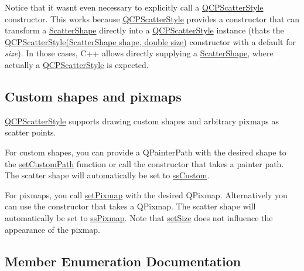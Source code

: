 \begin{DoxyCodeInclude}
\end{DoxyCodeInclude}
 Notice that it wasn\textquotesingle{}t even necessary to explicitly call a \hyperlink{classQCPScatterStyle}{Q\+C\+P\+Scatter\+Style} constructor. This works because \hyperlink{classQCPScatterStyle}{Q\+C\+P\+Scatter\+Style} provides a constructor that can transform a \hyperlink{classQCPScatterStyle_adb31525af6b680e6f1b7472e43859349}{Scatter\+Shape} directly into a \hyperlink{classQCPScatterStyle}{Q\+C\+P\+Scatter\+Style} instance (that\textquotesingle{}s the \hyperlink{classQCPScatterStyle_a003d92f74f4561eda111862eadd62f28}{Q\+C\+P\+Scatter\+Style(\+Scatter\+Shape shape, double size)} constructor with a default for {\itshape size}). In those cases, C++ allows directly supplying a \hyperlink{classQCPScatterStyle_adb31525af6b680e6f1b7472e43859349}{Scatter\+Shape}, where actually a \hyperlink{classQCPScatterStyle}{Q\+C\+P\+Scatter\+Style} is expected.\hypertarget{classQCPScatterStyle_QCPScatterStyle-custompath-and-pixmap}{}\subsection{Custom shapes and pixmaps}\label{classQCPScatterStyle_QCPScatterStyle-custompath-and-pixmap}
\hyperlink{classQCPScatterStyle}{Q\+C\+P\+Scatter\+Style} supports drawing custom shapes and arbitrary pixmaps as scatter points.

For custom shapes, you can provide a Q\+Painter\+Path with the desired shape to the \hyperlink{classQCPScatterStyle_a96a3e949f90b2afe5677ca9412a12a1e}{set\+Custom\+Path} function or call the constructor that takes a painter path. The scatter shape will automatically be set to \hyperlink{classQCPScatterStyle_adb31525af6b680e6f1b7472e43859349a15d9bcfd9de94edda949006529f9219d}{ss\+Custom}.

For pixmaps, you call \hyperlink{classQCPScatterStyle_a5fb611d46acfac520d7b89a1c71d9246}{set\+Pixmap} with the desired Q\+Pixmap. Alternatively you can use the constructor that takes a Q\+Pixmap. The scatter shape will automatically be set to \hyperlink{classQCPScatterStyle_adb31525af6b680e6f1b7472e43859349a8718b849ca7c307b07b8e091efb0c31e}{ss\+Pixmap}. Note that \hyperlink{classQCPScatterStyle_aaefdd031052892c4136129db68596e0f}{set\+Size} does not influence the appearance of the pixmap. 

\subsection{Member Enumeration Documentation}
